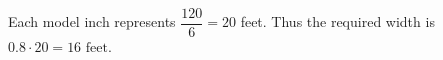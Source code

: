 Each model inch represents $\dfrac{120}{6}=20$ feet. Thus the required width is $0.8\cdot20=\boxed{16\text{ feet}}$.
